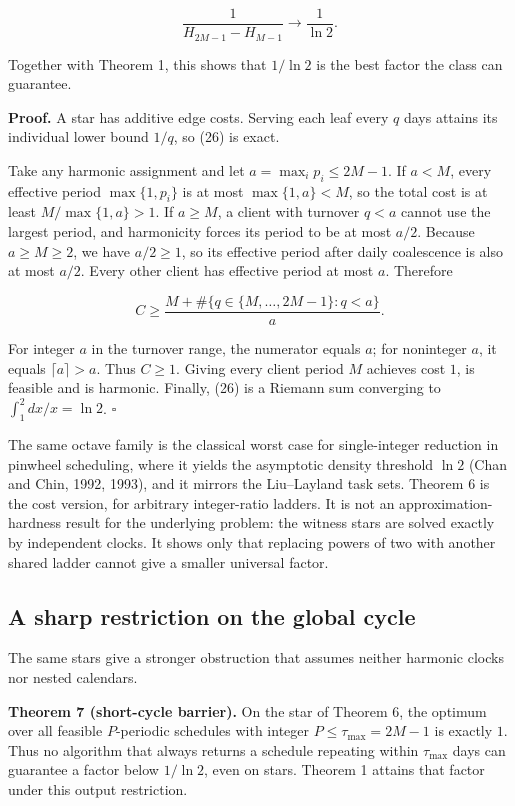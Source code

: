\documentclass[
  british,
  11pt,
  a4paper,
]{article}
\begin{document}
\[
\frac1{H_{2M-1}-H_{M-1}}\longrightarrow\frac1{\ln2}. \tag{27}
\]

Together with Theorem 1, this shows that \(1/\ln2\) is the best factor
the class can guarantee.

\textbf{Proof.} A star has additive edge costs. Serving each leaf every
\(q\) days attains its individual lower bound \(1/q\), so (26) is exact.

Take any harmonic assignment and let \(a=\max_i p_i\le2M-1\). If
\(a<M\), every effective period \(\max\{1,p_i\}\) is at most
\(\max\{1,a\}<M\), so the total cost is at least \(M/\max\{1,a\}>1\). If
\(a\ge M\), a client with turnover \(q<a\) cannot use the largest
period, and harmonicity forces its period to be at most \(a/2\). Because
\(a\ge M\ge2\), we have \(a/2\ge1\), so its effective period after daily
coalescence is also at most \(a/2\). Every other client has effective
period at most \(a\). Therefore

\[
C\ge\frac{M+\#\{q\in\{M,\ldots,2M-1\}:q<a\}}a. \tag{28}
\]

For integer \(a\) in the turnover range, the numerator equals \(a\); for
noninteger \(a\), it equals \(\lceil a\rceil>a\). Thus \(C\ge1\). Giving
every client period \(M\) achieves cost \(1\), is feasible and is
harmonic. Finally, (26) is a Riemann sum converging to
\(\int_1^2 dx/x=\ln2\). \(\square\)

The same octave family is the classical worst case for single-integer
reduction in pinwheel scheduling, where it yields the asymptotic density
threshold \(\ln2\) (Chan and Chin, 1992, 1993), and it mirrors the
Liu--Layland task sets. Theorem 6 is the cost version, for arbitrary
integer-ratio ladders. It is not an approximation-hardness result for
the underlying problem: the witness stars are solved exactly by
independent clocks. It shows only that replacing powers of two with
another shared ladder cannot give a smaller universal factor.

\subsection{A sharp restriction on the global
cycle}\label{a-sharp-restriction-on-the-global-cycle}

The same stars give a stronger obstruction that assumes neither harmonic
clocks nor nested calendars.

\textbf{Theorem 7 (short-cycle barrier).} On the star of Theorem 6, the
optimum over all feasible \(P\)-periodic schedules with integer
\(P\le\tau_{\max}=2M-1\) is exactly \(1\). Thus no algorithm that always
returns a schedule repeating within \(\tau_{\max}\) days can guarantee a
factor below \(1/\ln2\), even on stars. Theorem 1 attains that factor
under this output restriction.
\end{document}
